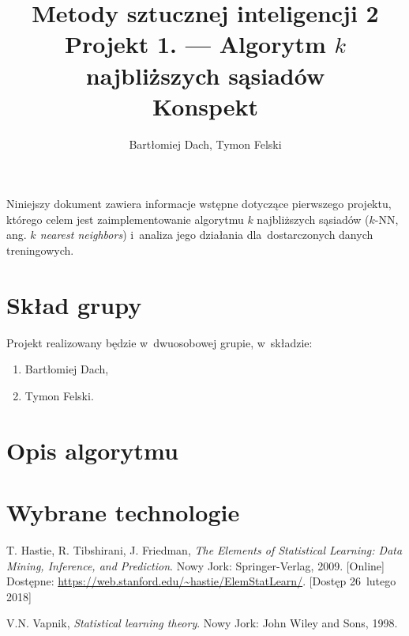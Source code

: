\documentclass[12pt,a4paper]{article}
\begin{document}
\title{Metody sztucznej inteligencji 2 \\
\Large{
    Projekt 1. --- Algorytm $k$ najbliższych sąsiadów \\
    Konspekt
}}
\author{Bartłomiej Dach, Tymon Felski}
\maketitle

Niniejszy dokument zawiera informacje wstępne dotyczące pierwszego projektu, którego celem jest zaimplementowanie algorytmu $k$ najbliższych sąsiadów ($k$-NN, ang. \emph{$k$ nearest neighbors}) i~analiza jego działania dla~dostarczonych danych treningowych.

\section{Skład grupy}

Projekt realizowany będzie w~dwuosobowej grupie, w~składzie:

\begin{enumerate}
    \item Bartłomiej Dach,
    \item Tymon Felski.
\end{enumerate}

\section{Opis algorytmu}

\section{Wybrane technologie}

\begin{thebibliography}{9}

        T. Hastie,
        R. Tibshirani,
        J. Friedman,
        \emph{The Elements of Statistical Learning: Data Mining, Inference, and Prediction}.
        Nowy Jork: Springer-Verlag,
        2009.
        [Online] \\
        Dostępne: \url{https://web.stanford.edu/~hastie/ElemStatLearn/}.
        [Dostęp 26~lutego 2018]

        V.N. Vapnik,
        \emph{Statistical learning theory}.
        Nowy Jork: John Wiley and Sons,
        1998.

\end{thebibliography}
\end{document}
